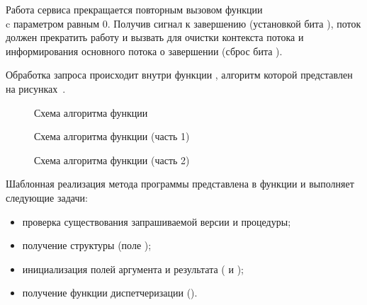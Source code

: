 Работа сервиса прекращается повторным вызовом функции \\
 c параметром  равным 0. Получив сигнал
к завершению (установкой бита ), поток должен прекратить
работу и вызвать  для очистки контекста потока и
информирования основного потока о завершении (сброс бита
).

Обработка запроса происходит внутри функции , алгоритм
которой представлен на
рисунках~.

\clearpage
\vspace*{\fill}
\begin{figure}[!h]
    \centering
    \def\svgwidth{\textwidth}
    
    \caption{Схема алгоритма функции }
    \label{fig:algorithm_svc_process}
\end{figure}
\vfill

\clearpage
\vspace*{\fill}
\begin{figure}[!h]
    \centering
    \def\svgwidth{\textwidth}
    
    \caption{Схема алгоритма функции  (часть 1)}
    \label{fig:algorithm_svc_process_common_1}
\end{figure}
\vfill

\clearpage
\vspace*{\fill}
\begin{figure}[!h]
    \centering
    \def\svgwidth{\textwidth}
    
    \caption{Схема алгоритма функции  (часть 2)}
    \label{fig:algorithm_svc_process_common_2}
\end{figure}
\vfill

\clearpage

Шаблонная реализация метода программы  представлена в
функции  и выполняет следующие задачи:
\begin{itemize}
    \item проверка существования запрашиваемой версии и процедуры;
    \item получение структуры  (поле );
    \item инициализация полей аргумента и результата
          ( и );
    \item получение функции диспетчеризации ().
\end{itemize}

